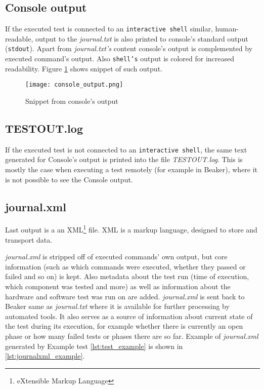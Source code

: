 \subsection{Console output}
\label{console_out}
If the executed test is connected to an \texttt{interactive shell} similar, human-readable, output to the \textit{journal.txt} is also printed to console's standard output (\texttt{stdout}). Apart from  \textit{journal.txt's} content console's output is complemented by executed command's output. Also \texttt{shell's} output is colored for increased readability.  Figure \ref{fig:console_output} shows snippet of such output.

\begin{figure}
  \texttt{[image: console\_output.png]}
  \caption{Snippet from console's output}
  \label{fig:console_output}
\end{figure}

\subsection{TESTOUT.log}
If the executed test is not connected to an \texttt{interactive shell}, the same text generated for Console's output is printed into the file \textit{TESTOUT.log}. This is mostly the case when executing a test remotely (for example in Beaker), where it is not possible to see the Console output.

\subsection{journal.xml}
Last output is a an XML\footnote{eXtensible Markup Language} file. XML is a markup language, designed to store and transport data\cite{xml_intro}.

\textit{journal.xml} is stripped off of executed commands' own output, but core information (such as which commands were executed, whether they passed or failed and so on) is kept. Also metadata about the test run (time of execution, which component was tested and more) as well as information about the hardware and software test was run on are added. \textit{journal.xml} is sent back to Beaker same as \textit{journal.txt} where it is available for further processing by automated tools. It also serves as a source of information about current state of the test during its execution, for example whether there is currently an open phase or how many failed tests or phases there are so far. Example of \textit{journal.xml} generated by Example test \ref{lst:test_example} is shown in \ref{lst:journalxml_example}.

